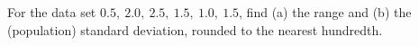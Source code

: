 For the data set $0.5,\ 2.0,\ 2.5,\ 1.5,\ 1.0,\ 1.5$, find (a) the range and (b) the (population) standard deviation, rounded to the nearest hundredth.
